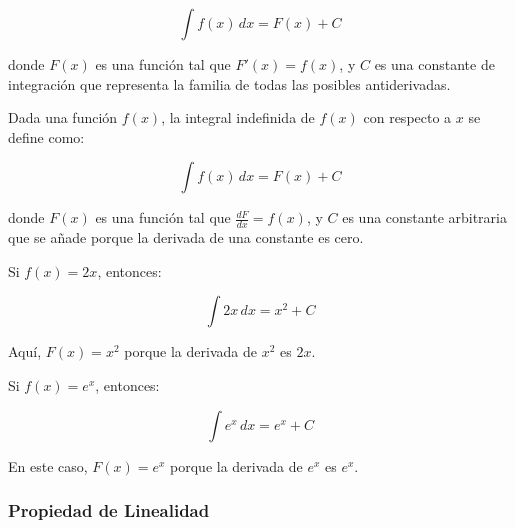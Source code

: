 \[
\int f(x) \, dx = F(x) + C
\]

donde \( F(x) \) es una función tal que \( F'(x) = f(x) \), y \( C \) es una constante de integración que representa la familia de todas las posibles antiderivadas.
\begin{center}
    \end{center}

    
\begin{definition}
    Dada una función \( f(x) \), la integral indefinida de \( f(x) \) con respecto a \( x \) se define como:

\[
\int f(x) \, dx = F(x) + C
\]

donde \( F(x) \) es una función tal que \( \frac{dF}{dx} = f(x) \), y \( C \) es una constante arbitraria que se añade porque la derivada de una constante es cero.

\end{definition}
\begin{example}
    Si \( f(x) = 2x \), entonces:

\[
\int 2x \, dx = x^2 + C
\]

Aquí, \( F(x) = x^2 \) porque la derivada de \( x^2 \) es \( 2x \).

\end{example}
\begin{example}
    Si \( f(x) = e^x \), entonces:

\[
\int e^x \, dx = e^x + C
\]

En este caso, \( F(x) = e^x \) porque la derivada de \( e^x \) es \( e^x \).
\end{example}
\subsubsection{Propiedad de Linealidad}

